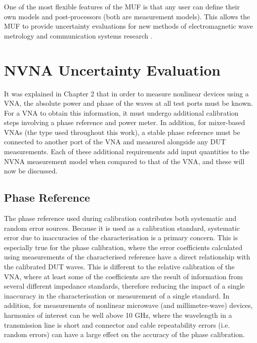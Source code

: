 \documentclass[../thesis/thesis.tex]{subfiles}
\begin{document}
One of the most flexible features of the MUF is that any user can define their own models and post-processors (both are measurement models). This allows the MUF to provide uncertainty evaluations for new methods of electromagnetic wave metrology and communication systems research \cite{Dortmans_2019, Gu_2019}.

\section{NVNA Uncertainty Evaluation}

It was explained in Chapter 2 that in order to measure nonlinear devices using a VNA, the absolute power and phase of the waves at all test ports must be known. For a VNA to obtain this information, it must undergo additional calibration steps involving a phase reference and power meter. In addition, for mixer-based VNAs (the type used throughout this work), a stable phase reference must be connected to another port of the VNA and measured alongside any DUT measurements. Each of these additional requirements add input quantities to the NVNA measurement model when compared to that of the VNA, and these will now be discussed.

\subsection{Phase Reference}

The phase reference used during calibration contributes both systematic and random error sources. Because it is used as a calibration standard, systematic error due to inaccuracies of the characterisation is a primary concern. This is especially true for the phase calibration, where the error coefficients calculated using measurements of the characterised reference have a direct relationship with the calibrated DUT waves. This is different to the relative calibration of the VNA, where at least some of the coefficients are the result of information from several different impedance standards, therefore reducing the impact of a single inaccuracy in the characterisation or measurement of a single standard. In addition, for measurements of nonlinear microwave (and millimetre-wave) devices, harmonics of interest can be well above 10 GHz, where the wavelength in a transmission line is short and connector and cable repeatability errors (i.e. random errors) can have a large effect on the accuracy of the phase calibration.
\end{document}

